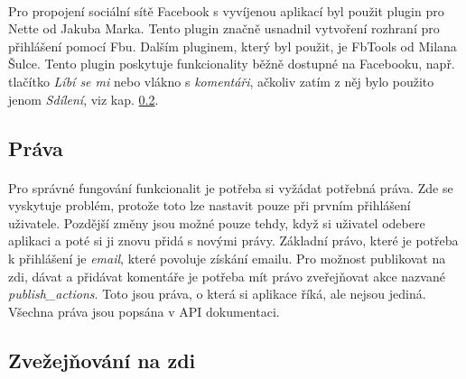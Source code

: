\documentclass[11pt,a4paper,titlepage,oneside]{book}
\begin{document}

				\paragraph{} Pro propojení sociální sítě Facebook s vyvíjenou aplikací byl použit plugin pro Nette\cite{nette20login} od Jakuba Marka. Tento plugin značně usnadnil vytvoření rozhraní pro přihlášení pomocí \acl{Fb}u. Dalším pluginem, který byl použit, je FbTools\cite{FbTools} od Milana Šulce. Tento plugin poskytuje funkcionality běžně dostupné na Facebooku, např. tlačítko \textit{Líbí se mi} nebo vlákno s \textit{komentáři}, ačkoliv zatím z něj bylo použito jenom \textit{Sdílení}, viz kap. \ref{sec:sdileni}.
			\subsection{Práva}
				\paragraph{} Pro správné fungování funkcionalit je potřeba si vyžádat potřebná  práva. Zde se vyskytuje problém, protože toto lze nastavit pouze při prvním přihlá\-šení uživatele. Pozdější změny jsou možné pouze tehdy, když si uživatel odebere aplikaci a poté si ji znovu přidá s novými právy. Základní právo, které je potřeba k přihlášení je \textit{email}, které povoluje získání emailu. Pro možnost publikovat na zdi, dávat  a přidávat komentáře je potřeba mít právo zveřejňovat akce nazvané \textit{publish\_actions}. Toto jsou práva, o která si aplikace říká, ale nejsou jediná. Všechna práva jsou popsána v API dokumentaci\cite{FbApiPrava}.
			\subsection{Zvežejňování na zdi}
				\label{sec:sdileni}
\end{document}

